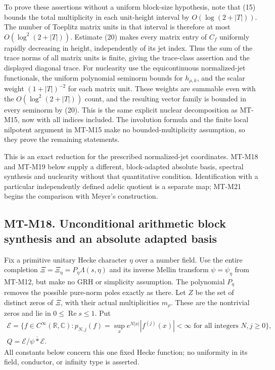 To prove these assertions without a uniform block-size
hypothesis, note that (15) bounds the total multiplicity
in each unit-height interval by $O(\log(2+|T|))$.
The number of Toeplitz matrix units in that interval is
therefore at most $O(\log^2(2+|T|))$.
Estimate (20) makes every matrix entry of $C_f$ uniformly
rapidly decreasing in height, independently of its jet
index. Thus the sum of the trace norms of all matrix
units is finite, giving the trace-class assertion and
the displayed diagonal trace. For nuclearity use the
equicontinuous normalized-jet functionals, the uniform
polynomial seminorm bounds for $h_{\rho,k}$, and the
scalar weight $(1+|T|)^{-2}$ for each matrix unit.
These weights are summable even with the
$O(\log^2(2+|T|))$ count, and the resulting vector
family is bounded in every seminorm by (20).
This is the same explicit nuclear decomposition as
MT-M15, now with all indices included.
The involution formula and the finite local nilpotent
argument in MT-M15 make no bounded-multiplicity
assumption, so they prove the remaining statements.

This is an exact reduction for the prescribed normalized-jet
coordinates. MT-M18 and MT-M19 below supply a different,
block-adapted absolute basis, spectral synthesis and nuclearity
without that quantitative condition. Identification with a
particular independently defined adelic quotient is a separate
map; MT-M21 begins the comparison with Meyer's construction.

\subsection*{MT-M18. Unconditional arithmetic block synthesis and an absolute adapted basis}

Fix a primitive unitary Hecke character \(\eta\) over a number field.
Use the entire completion \(\Xi=\Xi_\eta=P_\eta\Lambda(s,\eta)\)
and its inverse Mellin transform \(\psi=\psi_\eta\) from MT-M12,
but make no GRH or simplicity assumption.  The polynomial \(P_\eta\)
removes the possible pure-norm poles exactly as there.  Let \(Z\)
be the set of distinct zeros of \(\Xi\), with their actual
multiplicities \(m_\rho\).  These are the nontrivial zeros and
lie in \(0\le\operatorname{Re}s\le1\).
Put
\[
 \begin{gathered}
 \mathcal E=\{f\in C^\infty(\mathbb R,\mathbb C):
   p_{N,j}(f)=\sup_x e^{N|x|}|f^{(j)}(x)|<\infty
                    \text{ for all integers }N,j\ge0\},\\
 Q=\mathcal E/\overline{\psi*\mathcal E}.
 \end{gathered}
\]
All constants below concern this one fixed Hecke function; no
uniformity in its field, conductor, or infinity type is asserted.

